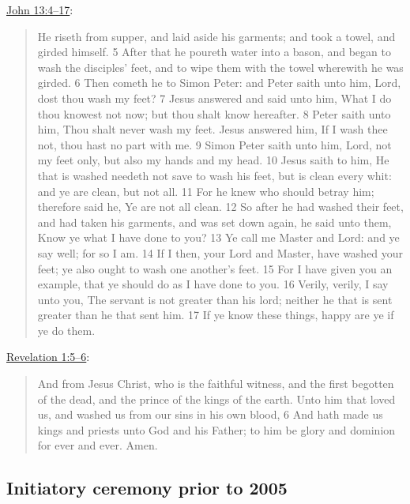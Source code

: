 		\hyperref[JOHN-13-4]{John 13:4--17}:
		
			\begin{quote}
				He riseth from supper, and laid aside his garments; and took a towel, and girded himself.
				5  After that he poureth water into a bason, and began to wash the disciples' feet, and to wipe them with the towel wherewith he was girded.
				6  Then cometh he to Simon Peter: and Peter saith unto him, Lord, dost thou wash my feet?
				7  Jesus answered and said unto him, What I do thou knowest not now; but thou shalt know hereafter.
				8  Peter saith unto him, Thou shalt never wash my feet.  Jesus answered him, If I wash thee not, thou hast no part with me.
				9  Simon Peter saith unto him, Lord, not my feet only, but also my hands and my head.
				10  Jesus saith to him, He that is washed needeth not save to wash his feet, but is clean every whit: and ye are clean, but not all.
				11  For he knew who should betray him; therefore said he, Ye are not all clean.
				12  So after he had washed their feet, and had taken his garments, and was set down again, he said unto them, Know ye what I have done to you?
				13  Ye call me Master and Lord: and ye say well; for so I am.
				14  If I then, your Lord and Master, have washed your feet; ye also ought to wash one another's feet.
				15  For I have given you an example, that ye should do as I have done to you.
				16  Verily, verily, I say unto you, The servant is not greater than his lord; neither he that is sent greater than he that sent him.
				17  If ye know these things, happy are ye if ye do them.
			\end{quote}
			
		\hyperref[REVELATION-1-5]{Revelation 1:5--6}:
		
			\begin{quote}
				And from Jesus Christ, who is the faithful witness, and the first begotten of the dead, and the prince of the kings of the earth. Unto him that loved us, and washed us from our sins in his own blood, 6 And hath made us kings and priests unto God and his Father; to him be glory and dominion for ever and ever. Amen.
			\end{quote}

	\subsection{Initiatory ceremony prior to 2005}
		\label{TEMPLE-ENDOWMENT-INIT-PRE-2005}
	
